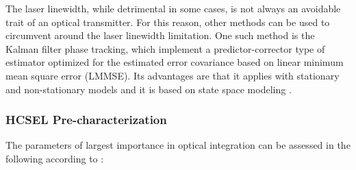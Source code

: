 The laser linewidth, while detrimental in some cases, is not always an avoidable trait of an optical transmitter. For this reason, other methods can be used to circumvent around the laser linewidth limitation. One such method is the Kalman filter phase tracking, which implement a predictor-corrector type of estimator optimized for the estimated error covariance based on linear minimum mean square error (LMMSE). Its advantages are that it applies with stationary and non-stationary models and it is based on state space modeling \cite{AcunaPnoise13}. 

\subsubsection{HCSEL Pre-characterization}

 The parameters of largest importance in optical integration can be assessed in the following according to \cite{HertsensLD05}:


